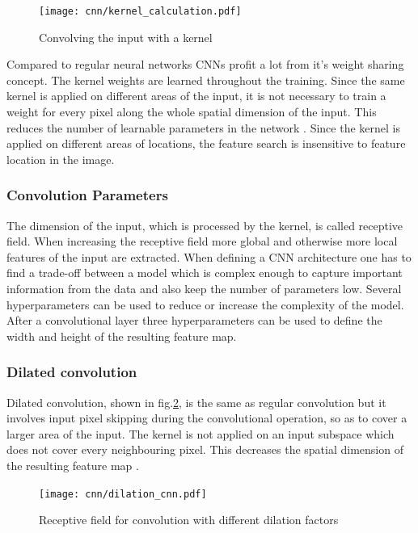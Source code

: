 \begin{figure}[H]
  \centering
  \texttt{[image: cnn/kernel\_calculation.pdf]}
  \caption {Convolving the input with a kernel \cite{Ganesh2019}}
  \label{fig:kernel}
\end{figure}

Compared to regular neural networks CNNs profit a lot from it's weight sharing concept. The kernel weights are learned throughout the training. Since the same kernel is applied on different areas of the input, it is not necessary to train a weight for every pixel along the whole spatial dimension of the input. This reduces the number of learnable parameters in the network \cite{OShea2015}. Since the kernel is applied on different areas of locations, the feature search is insensitive to feature location in the image.

\subsubsection{Convolution Parameters}

The dimension of the input, which is processed by the kernel, is called receptive field. When increasing the receptive field more global and otherwise more local features of the input are extracted. When defining a CNN architecture one has to find a trade-off between a model which is complex enough to capture important information from the data and also keep the number of parameters low. Several hyperparameters can be used to reduce or increase the complexity of the model. After a convolutional layer three hyperparameters can be used to define the width and height of the resulting feature map. 

\subsubsection{Dilated convolution}
Dilated convolution, shown in fig.\ref{fig:dilated_cnn}, is the same as regular convolution but it involves input pixel skipping during the convolutional operation, so as to cover a larger area of the input. The kernel is not applied on an input subspace which does not cover every neighbouring pixel. This decreases the spatial dimension of the resulting feature map \cite{Ganesh2019}.

\begin{figure}[H]
  \centering
  \texttt{[image: cnn/dilation\_cnn.pdf]}
  \caption {Receptive field for convolution with different dilation factors}
  \label{fig:dilated_cnn}
\end{figure}


